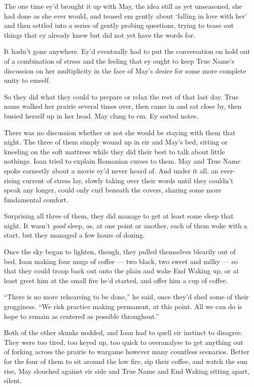 The one time ey'd brought it up with May, the idea still as yet unseasoned, she had done as she ever would, and teased em gently about `falling in love with her' and then settled into a series of gently probing questions, trying to tease out things that ey already knew but did not yet have the words for.

It hadn't gone anywhere. Ey'd eventually had to put the conversation on hold out of a combination of stress and the feeling that ey ought to keep True Name's discussion on her multiplicity in the face of May's desire for some more complete unity to emself.

So they did what they could to prepare or relax the rest of that last day. True name walked her prairie several times over, then came in and sat close by, then busied herself up in her head. May clung to em. Ey sorted notes.

There was no discussion whether or not she would be staying with them that night. The three of them simply wound up in eir and May's bed, sitting or kneeling on the soft mattress while they did their best to talk about little nothings. Ioan tried to explain Romanian curses to them. May and True Name spoke earnestly about a movie ey'd never heard of. And under it all, an ever-rising current of stress lay, slowly taking over their words until they couldn't speak any longer, could only curl beneath the covers, sharing some more fundamental comfort.

Surprising all three of them, they did manage to get at least some sleep that night. It wasn't \emph{good} sleep, as, at one point or another, each of them woke with a start, but they managed a few hours of dozing.

Once the sky began to lighten, though, they pulled themselves blearily out of bed, Ioan making four mugs of coffee — two black, two sweet and milky — so that they could troop back out onto the plain and wake End Waking up, or at least greet him at the small fire he'd started, and offer him a cup of coffee.

``There is no more rehearsing to be done,'' he said, once they'd shed some of their grogginess. ``We risk practice making permanent, at this point. All we can do is hope to remain as centered as possible throughout.''

Both of the other skunks nodded, and Ioan had to quell eir instinct to disagree. They were too tired, too keyed up, too quick to overanalyse to get anything out of forking across the prairie to wargame however many countless scenarios. Better for the four of them to sit around the low fire, sip their coffee, and watch the sun rise, May slouched against eir side and True Name and End Waking sitting apart, silent.

